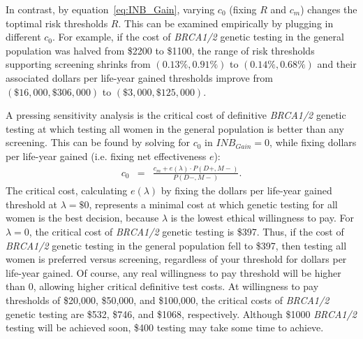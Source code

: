 \documentclass[AMA,STIX1COL]{WileyNJD-v2}
\begin{document}
In contrast, by equation~\ref{eq:INB_Gain}, varying $c_0$ (fixing $R$ and $c_m$) changes the toptimal risk thresholds $R$.  This can be examined empirically by plugging in different $c_0$.  For example, if the cost of \textit{BRCA1/2} genetic testing in the general population was halved from \$2200 to \$1100, the range of risk thresholds supporting screening shrinks from $(0.13\%,0.91\%)$ to $(0.14\%,0.68\%)$ and their associated dollars per life-year gained thresholds improve from $(\$16,\!000,\$306,\!000)$ to $(\$3,\!000,\$125,\!000)$.

A pressing sensitivity analysis is the critical cost of definitive \textit{BRCA1/2} genetic testing at which testing all women in the general population is better than any screening.  This can be found by solving for $c_0$ in $I\!N\!B_{Gain}=0$, while fixing dollars per life-year gained (i.e. fixing net effectiveness $e$):
\begin{eqnarray*}
	c_0 &=& \frac{c_m+e(\lambda)\cdot P(D+,M-)} {P(D-,M-)}.
\end{eqnarray*}
The critical cost, calculating $e(\lambda)$ by fixing the dollars per life-year gained threshold at $\lambda=\$0$, represents a minimal cost at which genetic testing for all women is the best decision, because $\lambda$ is the lowest ethical willingness to pay.  For $\lambda=0$, the critical cost of \textit{BRCA1/2} genetic testing is \$397.  Thus, if the cost of \textit{BRCA1/2} genetic testing in the general population fell to \$397, then testing all women is preferred versus screening, regardless of your threshold for dollars per life-year gained.  Of course, any real willingness to pay threshold will be higher than 0, allowing higher critical definitive test costs.  At willingness to pay thresholds of \$20,000, \$50,000, and \$100,000, the critical costs of \textit{BRCA1/2} genetic testing are \$532, \$746, and \$1068, respectively.  Although \$1000 \textit{BRCA1/2} testing will be achieved soon, \$400 testing may take some time to achieve.
\end{document}
